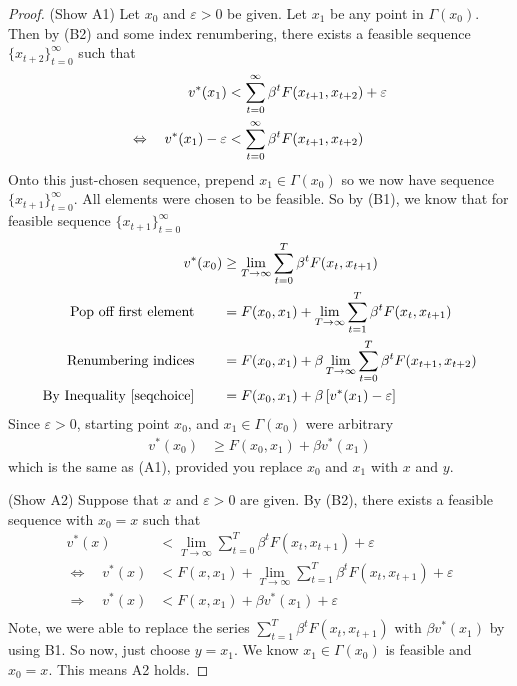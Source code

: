\documentclass[12pt]{article}
\numberwithin{equation}{section} %
\theoremstyle{plain}
\theoremstyle{definition}
\theoremstyle{remark}
\newcommand{\sumtT}{\sum^T_{t=1}}
\newcommand{\sumtTz}{\sum^T_{t=0}}
\newcommand{\sumtinfz}{\sum^\infty_{t=0}}
\begin{document}
\begin{proof}
(Show A1) Let $x_0$ and $\varepsilon>0$ be given.
Let $x_1$ be any point in $\Gamma(x_0)$. Then by (B2)
and some index renumbering, there exists a feasible sequence
$\{x_{t+2}\}_{t=0}^\infty$ such that
\begin{align}
  v^*(x_1) &< \sumtinfz \beta^t
  F(x_{t+1}, x_{t+2}) + \varepsilon \notag \\
  \Leftrightarrow\quad
  v^*(x_1) - \varepsilon &< \sumtinfz \beta^t
  F(x_{t+1}, x_{t+2})
  \label{seqchoice}
\end{align}
Onto this just-chosen sequence, prepend
$x_1\in\Gamma(x_0)$ so we now have sequence
$\{x_{t+1}\}_{t=0}^\infty$. All elements were chosen to be
feasible.  So by (B1), we know that for feasible sequence
$\{x_{t+1}\}_{t=0}^\infty$
\begin{align*}
  v^*(x_0)
  &\geq \lim_{T\rightarrow\infty} \sumtTz \beta^t F(x_t,x_{t+1}) \\
  \text{Pop off first element} \qquad
  &= F(x_0, x_1) + \lim_{T\rightarrow\infty} \sumtT \beta^t F(x_t,x_{t+1}) \\
  \text{Renumbering indices} \qquad
  &= F(x_0, x_1) + \beta \lim_{T\rightarrow\infty} \sumtTz \beta^{t} F(x_{t+1},x_{t+2}) \\
  \text{By Inequality~\ref{seqchoice}} \qquad
  &= F(x_0, x_1)
  + \beta \left[ v^*(x_1) - \varepsilon\right]
\end{align*}
Since $\varepsilon>0$, starting point $x_0$, and
$x_1\in\Gamma(x_0)$ were arbitrary
\begin{align*}
  v^*(x_0)
  &\geq F(x_0, x_1)
  + \beta  v^*(x_1)
\end{align*}
which is the same as (A1), provided you replace $x_0$ and $x_1$ with $x$
and $y$.

(Show A2)
Suppose that $x$ and $\varepsilon>0$ are given.
By (B2), there exists a feasible sequence with $x_0=x$ such that
\begin{align*}
  v^*(x) &< \lim_{T\rightarrow\infty} \sumtTz \beta^t
  F(x_{t}, x_{t+1}) + \varepsilon \\
  \Leftrightarrow\quad
  v^*(x) &< F(x, x_1)
  + \lim_{T\rightarrow\infty}
  \sumtT \beta^t
  F(x_{t}, x_{t+1}) + \varepsilon \\
  \Rightarrow\quad
  v^*(x) &< F(x, x_1)
  + \beta v^*(x_1)
  + \varepsilon \\
\end{align*}
Note, we were able to replace the series $\sumtT \beta^t F(x_{t},
x_{t+1})$ with $\beta v^*(x_1)$ by using B1.
So now, just choose $y=x_1$. We know $x_1\in\Gamma(x_0)$ is feasible
and $x_0=x$. This means A2 holds.
\end{proof}
\end{document}

